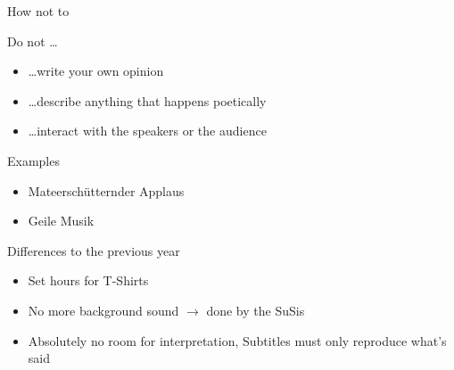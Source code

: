 \documentclass[utf8,widescreen]{beamer}
\begin{document}
\begin{frame}{How not to}
\pause
\begin{block}{Do not \dots}
\begin{itemize}\itemsep 10pt
\item{\dots write your own opinion}
\pause
\item{\dots describe anything that happens poetically}
\pause
\item{\dots interact with the speakers or the audience}
\end{itemize}
\pause
\end{block}
\begin{block}{Examples}
\begin{itemize}\itemsep 10pt
\item{Mateerschütternder Applaus}
\pause
\item{Geile Musik}
\end{itemize}
\end{block}
\end{frame}

\begin{frame}{Differences to the previous year}
\pause
\begin{block}{}
\begin{itemize}\itemsep 14pt
\item{Set hours for T-Shirts}
\pause
\item{No more background sound $\rightarrow$ done by the SuSis}
\pause
\item{Absolutely no room for interpretation, Subtitles must only reproduce what's said}
\end{itemize}
\end{block}
\end{frame}
\end{document}
